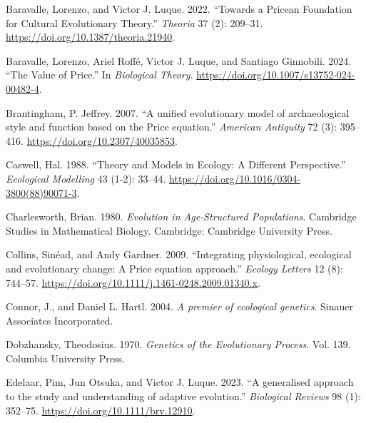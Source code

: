 \documentclass[
]{article}
\newlength{\cslhangindent}
\newlength{\cslentryspacingunit} %
\newenvironment{CSLReferences}[2] %
 {%
  \setlength{\parindent}{0pt}
  \ifodd #1
  \let\oldpar\par
  \def\par{\hangindent=\cslhangindent\oldpar}
  \fi
  \setlength{\parskip}{#2\cslentryspacingunit}
 }%
 {}
\begin{document}
\hypertarget{refs}{}
\begin{CSLReferences}{1}{0}
\leavevmode{}%
Baravalle, Lorenzo, and Victor J. Luque. 2022. {``Towards a Pricean
Foundation for Cultural Evolutionary Theory.''} \emph{Theoria} 37 (2):
209--31. \url{https://doi.org/10.1387/theoria.21940}.

\leavevmode{}%
Baravalle, Lorenzo, Ariel Roffé, Victor J. Luque, and Santiago
Ginnobili. 2024. {``The Value of Price.''} In \emph{Biological Theory}.
\url{https://doi.org/10.1007/s13752-024-00482-4}.

\leavevmode{}%
Brantingham, P. Jeffrey. 2007. {``{A unified evolutionary model of
archaeological style and function based on the Price equation}.''}
\emph{American Antiquity} 72 (3): 395--416.
\url{https://doi.org/10.2307/40035853}.

\leavevmode{}%
Caswell, Hal. 1988. {``Theory and Models in Ecology: A Different
Perspective.''} \emph{Ecological Modelling} 43 (1-2): 33--44.
\url{https://doi.org/10.1016/0304-3800(88)90071-3}.

\leavevmode{}%
Charlesworth, Brian. 1980. \emph{Evolution in Age-Structured
Populations}. Cambridge Studies in Mathematical Biology. Cambridge:
Cambridge University Press.

\leavevmode{}%
Collins, Sinéad, and Andy Gardner. 2009. {``{Integrating physiological,
ecological and evolutionary change: A Price equation approach}.''}
\emph{Ecology Letters} 12 (8): 744--57.
\url{https://doi.org/10.1111/j.1461-0248.2009.01340.x}.

\leavevmode{}%
Connor, J., and Daniel L. Hartl. 2004. \emph{{A premier of ecological
genetics}}. Sinauer Associates Incorporated.

\leavevmode{}%
Dobzhansky, Theodosius. 1970. \emph{Genetics of the Evolutionary
Process}. Vol. 139. Columbia University Press.

\leavevmode{}%
Edelaar, Pim, Jun Otsuka, and Victor J. Luque. 2023. {``{A generalised
approach to the study and understanding of adaptive evolution}.''}
\emph{Biological Reviews} 98 (1): 352--75.
\url{https://doi.org/10.1111/brv.12910}.


\end{CSLReferences}
\end{document}
